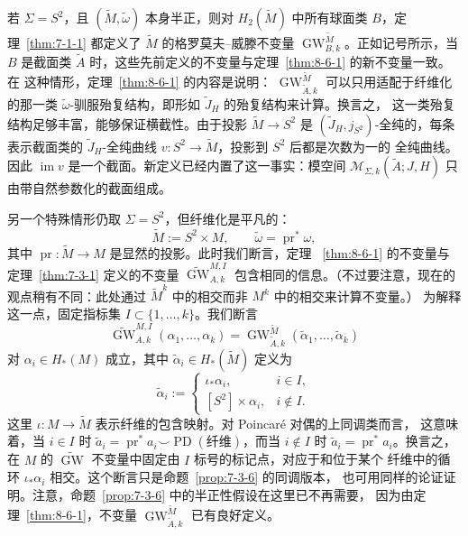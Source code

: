\begin{remark}\label{rem:8-6-3}
若 $\Sigma=S^2$，且 $(\widetilde M,\widetilde\omega)$ 本身半正，则对
$H_2(\widetilde M)$ 中所有球面类 $B$，定理~\ref{thm:7-1-1} 都定义了
$\widetilde M$ 的格罗莫夫--威滕不变量
$\operatorname{GW}^{\widetilde M}_{B,k}$。正如记号所示，当 $B$ 是截面类
$\widetilde A$ 时，这些先前定义的不变量与定理~\ref{thm:8-6-1} 的新不变量一致。在
这种情形，定理~\ref{thm:8-6-1} 的内容是说明：
$\operatorname{GW}^{\widetilde M}_{\widetilde A,k}$ 可以只用适配于纤维化的那一类
$\widetilde\omega$-驯服殆复结构，即形如 $\widetilde J_H$ 的殆复结构来计算。换言之，
这一类殆复结构足够丰富，能够保证横截性。由于投影
$\widetilde M\to S^2$ 是 $(\widetilde J_H,j_{S^2})$-全纯的，每条表示截面类的
$\widetilde J_H$-全纯曲线 $v:S^2\to\widetilde M$，投影到 $S^2$ 后都是次数为一的
全纯曲线。因此 $\operatorname{im}v$ 是一个截面。新定义已经内置了这一事实：模空间
$\mathcal M_{\Sigma,k}(\widetilde A;J,H)$ 只由带自然参数化的截面组成。

另一个特殊情形仍取 $\Sigma=S^2$，但纤维化是平凡的：
\[
  \widetilde M:=S^2\times M,
  \qquad \widetilde\omega=\operatorname{pr}^*\omega,
\]
其中 $\operatorname{pr}:\widetilde M\to M$ 是显然的投影。此时我们断言，定理
~\ref{thm:8-6-1} 的不变量与定理~\ref{thm:7-3-1} 定义的不变量
$\widetilde{\operatorname{GW}}^{M,I}_{A,k}$ 包含相同的信息。（不过要注意，现在的
观点稍有不同：此处通过 $\widetilde M^k$ 中的相交而非 $M^k$ 中的相交来计算不变量。）
为解释这一点，固定指标集 $I\subset\{1,\ldots,k\}$。我们断言
\begin{equation}\label{eq:8-6-2}
  \widetilde{\operatorname{GW}}^{M,I}_{A,k}
  (\alpha_1,\ldots,\alpha_k)
  =\operatorname{GW}^{\widetilde M}_{\widetilde A,k}
  (\widetilde\alpha_1,\ldots,\widetilde\alpha_k)
\end{equation}
对 $\alpha_i\in H_*(M)$ 成立，其中 $\widetilde\alpha_i\in H_*(\widetilde M)$ 定义为
\[
  \widetilde\alpha_i:=
  \begin{cases}
    \iota_*\alpha_i,&i\in I,\\
    [S^2]\times\alpha_i,&i\notin I.
  \end{cases}
\]
这里 $\iota:M\to\widetilde M$ 表示纤维的包含映射。对 Poincaré 对偶的上同调类而言，
这意味着，当 $i\in I$ 时
$\widetilde a_i=\operatorname{pr}^*a_i\smile\operatorname{PD}(\text{纤维})$，而当
$i\notin I$ 时 $\widetilde a_i=\operatorname{pr}^*a_i$。换言之，在 $M$ 的
$\widetilde{\operatorname{GW}}$ 不变量中固定由 $I$ 标号的标记点，对应于和位于某个
纤维中的循环 $\iota_*\alpha_i$ 相交。这个断言只是命题~\ref{prop:7-3-6} 的同调版本，
也可用同样的论证证明。注意，命题~\ref{prop:7-3-6} 中的半正性假设在这里已不再需要，
因为由定理~\ref{thm:8-6-1}，不变量
$\operatorname{GW}^{\widetilde M}_{\widetilde A,k}$ 已有良好定义。
\end{remark}

